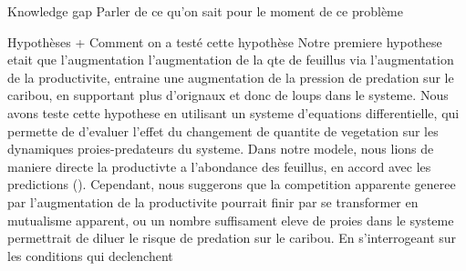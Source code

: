 Knowledge gap
Parler de ce qu'on sait pour le moment de ce problème \cite{chaguaceda2021}


Hypothèses + Comment on a testé cette hypothèse
Notre premiere hypothese etait que l'augmentation l'augmentation de la qte de feuillus via l'augmentation de la productivite, entraine une augmentation de la pression de predation sur le caribou, en supportant plus d'orignaux et donc de loups dans le systeme. Nous avons teste cette hypothese en utilisant un systeme d'equations differentielle, qui permette de d'evaluer l'effet du changement de quantite de vegetation sur les dynamiques proies-predateurs du systeme. Dans notre modele, nous lions de maniere directe la productivte a l'abondance des feuillus, en accord avec les predictions (\textcolor{trouver ref}). Cependant, nous suggerons que la competition apparente generee par l'augmentation de la productivite pourrait finir par se transformer en mutualisme apparent, ou un nombre suffisament eleve de proies dans le systeme permettrait de diluer le risque de predation sur le caribou. En s'interrogeant sur les conditions qui declenchent 

